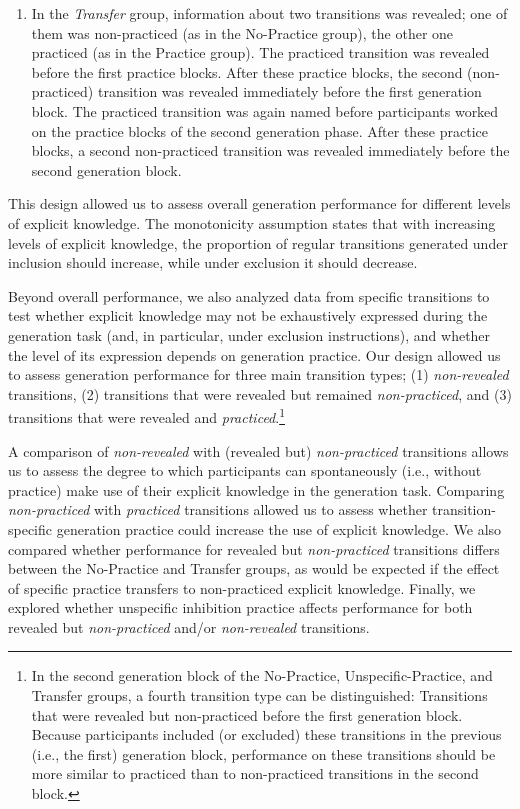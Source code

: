 \documentclass[floatsintext,doc]{apa6}
\providecommand{\tightlist}{%
  \setlength{\itemsep}{0pt}\setlength{\parskip}{0pt}}
\theoremstyle{definition}
\theoremstyle{definition}
\theoremstyle{definition}
\theoremstyle{remark}
\begin{document}
\begin{enumerate}
\def\labelenumi{\arabic{enumi}.}
\setcounter{enumi}{4}
\tightlist
\item
  In the \emph{Transfer} group, information about two transitions was
  revealed; one of them was non-practiced (as in the No-Practice group),
  the other one practiced (as in the Practice group). The practiced
  transition was revealed before the first practice blocks. After these
  practice blocks, the second (non-practiced) transition was revealed
  immediately before the first generation block. The practiced
  transition was again named before participants worked on the practice
  blocks of the second generation phase. After these practice blocks, a
  second non-practiced transition was revealed immediately before the
  second generation block.
\end{enumerate}

This design allowed us to assess overall generation performance for
different levels of explicit knowledge. The monotonicity assumption
states that with increasing levels of explicit knowledge, the proportion
of regular transitions generated under inclusion should increase, while
under exclusion it should decrease.

Beyond overall performance, we also analyzed data from specific
transitions to test whether explicit knowledge may not be exhaustively
expressed during the generation task (and, in particular, under
exclusion instructions), and whether the level of its expression depends
on generation practice. Our design allowed us to assess generation
performance for three main transition types; (1) \emph{non-revealed}
transitions, (2) transitions that were revealed but remained
\emph{non-practiced}, and (3) transitions that were revealed and
\emph{practiced}.\footnote{In the second generation block of the
  No-Practice, Unspecific-Practice, and Transfer groups, a fourth
  transition type can be distinguished: Transitions that were revealed
  but non-practiced before the first generation block. Because
  participants included (or excluded) these transitions in the previous
  (i.e., the first) generation block, performance on these transitions
  should be more similar to practiced than to non-practiced transitions
  in the second block.}

A comparison of \emph{non-revealed} with (revealed but)
\emph{non-practiced} transitions allows us to assess the degree to which
participants can spontaneously (i.e., without practice) make use of
their explicit knowledge in the generation task. Comparing
\emph{non-practiced} with \emph{practiced} transitions allowed us to
assess whether transition-specific generation practice could increase
the use of explicit knowledge. We also compared whether performance for
revealed but \emph{non-practiced} transitions differs between the
No-Practice and Transfer groups, as would be expected if the effect of
specific practice transfers to non-practiced explicit knowledge.
Finally, we explored whether unspecific inhibition practice affects
performance for both revealed but \emph{non-practiced} and/or
\emph{non-revealed} transitions.
\end{document}
